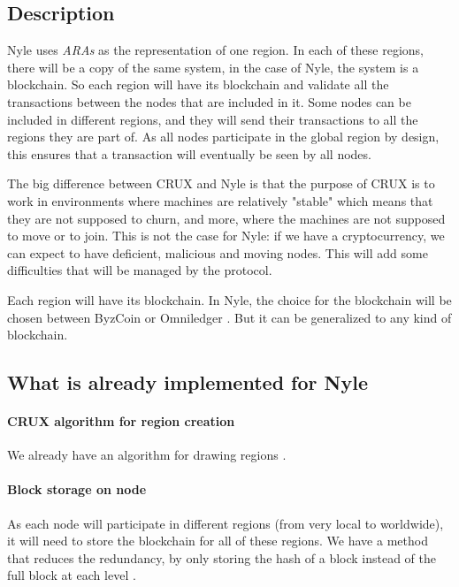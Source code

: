 \documentclass[a4paper,11pt,oneside]{report}
\begin{document}
\subsection{Description}

Nyle uses \textit{ARAs} as the representation of one region. In each of these regions,
there will be a copy of the same system, in the case of Nyle, the system is a
blockchain. So each region will have its blockchain and validate all the
transactions between the nodes that are included in it. Some nodes can be
included in different regions, and they will send their transactions to all the
regions they are part of. As all nodes participate in the global region by design, this ensures that a transaction will eventually be seen by all nodes.

The big difference between CRUX \cite{Basescu2014} and Nyle is that the purpose
of CRUX \cite{Basescu2014} is to work in environments where machines are
relatively "stable" which means that they are not supposed to churn, and more, where the machines are not supposed to move or to join. This is not the
case for Nyle: if we have a cryptocurrency, we can expect to have deficient, malicious and moving nodes. This will add some difficulties that will be
managed by the protocol.

Each region will have its blockchain. In Nyle, the choice for the blockchain
will be chosen between ByzCoin
\cite{Kogias2016} or Omniledger \cite{Kokoris-Kogias2017}. But it can be generalized to any kind of blockchain.

\subsection{What is already implemented for Nyle} 
\paragraph{CRUX algorithm for region creation} 
We already have an algorithm for drawing regions \cite{Basescu2014}.

\paragraph{Block storage on node} As each node will participate in
different regions (from very local to worldwide), it will need to store the
blockchain for all of these regions. We have a method that reduces the
redundancy, by only storing the hash of a block instead of the full block at
each level \cite{Sierro2019}. 
\end{document}
